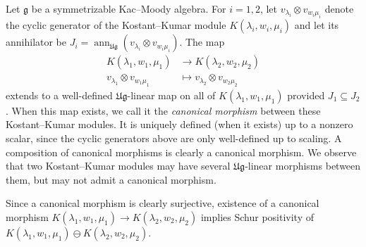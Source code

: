 \documentclass[12pt,reqno]{amsart}
\theoremstyle{plain}
\theoremstyle{definition}
\theoremstyle{remark}
\theoremstyle{plain}
\newcommand{\lie}{\mathfrak}
\DeclareMathOperator{\ann}{ann}
\begin{document}
Let $\lie g$ be a symmetrizable Kac--Moody algebra.  For $i=1,2$, let $v_{\lambda_i} \otimes v_{w_i \mu_i}$ denote the cyclic generator of the Kostant--Kumar module $K(\lambda_i,w_i,\mu_i)$  and let its annihilator be $J_i = \ann_{\lie{Ug}}(v_{\lambda_i} \otimes v_{w_i\mu_i})$. The map
\begin{align*} 
K(\lambda_1,w_1,\mu_1) &\to K(\lambda_2,w_2,\mu_2) \\
v_{\lambda_1} \otimes v_{w_1\mu_1} &\mapsto v_{\lambda_2} \otimes v_{w_2\mu_2}
\end{align*}
extends to a well-defined $\lie{Ug}$-linear map on all of $K(\lambda_1,w_1,\mu_1)$ provided $J_1 \subseteq J_2$. When this map exists, we call it the {\em canonical morphism} between these Kostant--Kumar modules. It is uniquely defined (when it exists) up to a nonzero scalar, since the cyclic generators above are only well-defined up to scaling.  
A composition of canonical morphisms is clearly a canonical morphism.
We observe that two Kostant--Kumar modules may have several $\lie{Ug}$-linear morphisms between them, but may not admit a canonical morphism.

Since a canonical morphism is clearly surjective, existence of a canonical morphism 
$K(\lambda_1,w_1,\mu_1) \to K(\lambda_2,w_2,\mu_2)$ implies Schur positivity of 
$K(\lambda_1,w_1,\mu_1) \ominus K(\lambda_2,w_2,\mu_2)$.
\end{document}
